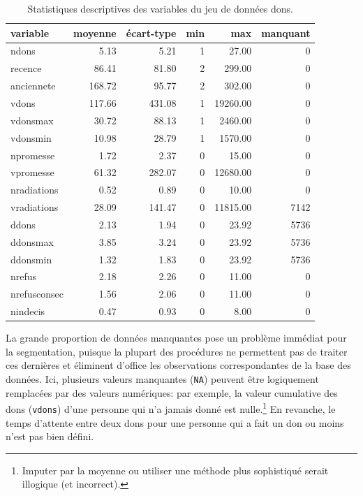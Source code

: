 \documentclass[
  11pt,
  letterpaper,
]{scrbook}
\theoremstyle{definition}
\theoremstyle{remark}
\begin{document}
\begin{longtable}[]{@{}lrrrrr@{}}

\caption{\label{tbl-statdescriptdons}Statistiques descriptives des
variables du jeu de données dons.}

\tabularnewline

\toprule\noalign{}
variable & moyenne & écart-type & min & max & manquant \\
\midrule\noalign{}
\endhead
\bottomrule\noalign{}
\endlastfoot
ndons & 5.13 & 5.21 & 1 & 27.00 & 0 \\
recence & 86.41 & 81.80 & 2 & 299.00 & 0 \\
anciennete & 168.72 & 95.77 & 2 & 302.00 & 0 \\
vdons & 117.66 & 431.08 & 1 & 19260.00 & 0 \\
vdonsmax & 30.72 & 88.13 & 1 & 2460.00 & 0 \\
vdonsmin & 10.98 & 28.79 & 1 & 1570.00 & 0 \\
npromesse & 1.72 & 2.37 & 0 & 15.00 & 0 \\
vpromesse & 61.32 & 282.07 & 0 & 12680.00 & 0 \\
nradiations & 0.52 & 0.89 & 0 & 10.00 & 0 \\
vradiations & 28.09 & 141.47 & 0 & 11815.00 & 7142 \\
ddons & 2.13 & 1.94 & 0 & 23.92 & 5736 \\
ddonsmax & 3.85 & 3.24 & 0 & 23.92 & 5736 \\
ddonsmin & 1.32 & 1.83 & 0 & 23.92 & 5736 \\
nrefus & 2.18 & 2.26 & 0 & 11.00 & 0 \\
nrefusconsec & 1.56 & 2.06 & 0 & 11.00 & 0 \\
nindecis & 0.47 & 0.93 & 0 & 8.00 & 0 \\

\end{longtable}

La grande proportion de données manquantes pose un problème immédiat
pour la segmentation, puisque la plupart des procédures ne permettent
pas de traiter ces dernières et éliminent d'office les observations
correspondantes de la base des données. Ici, plusieurs valeurs
manquantes (\texttt{NA}) peuvent être logiquement remplacées par des
valeurs numériques: par exemple, la valeur cumulative des dons
(\texttt{vdons}) d'une personne qui n'a jamais donné est
nulle.\footnote{Imputer par la moyenne ou utiliser une méthode plus
  sophistiqué serait illogique (et incorrect).} En revanche, le temps
d'attente entre deux dons pour une personne qui a fait un don ou moins
n'est pas bien défini.
\end{document}
